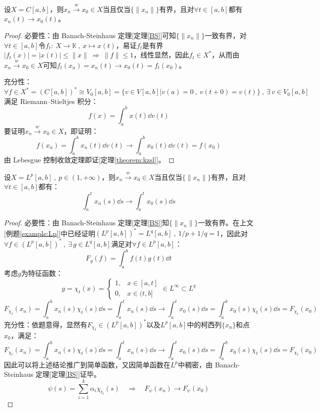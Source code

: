 \begin{theorem}
设$X=C[a,b]$，则$x_n \xrightarrow{w} x_0 \in X$当且仅当$\{\|x_n\|\}$有界，且对$\forall t \in [a,b]$都有$x_n(t) \to x_0(t)$。
\end{theorem}
\begin{proof}
必要性：由 Banach-Steinhaus 定理[定理\ref{BS}]可知$\{\|x_n\|\}$一致有界，对$\forall t \in [a,b]$令$f_t: \ X \to \mathbb{K} \ , \ x \mapsto x(t)$，易证$f_t$是有界$|f_t(x)|=|x(t)|\leq\|x\| \ \Rightarrow \ \|f\| \leq 1$，线性显然，因此$f_t \in X^*$，从而由$x_n \xrightarrow{w} x_0 \in X$可知$f_t(x_n)=x_n(t) \to x_0(t)=f_t(x_0)$。

充分性：$\forall f \in X^*=(C[a,b])^*\cong V_0[a,b]=\{v \in V[a,b]|v(a)=0 \ , \ v(t+0)=v(t)\} \ , \ \exists \, v \in V_0[a,b]$满足 Riemann–Stieltjes 积分：
\[f(x)=\int_a^bx(t)\dd{v(t)}\]
要证明$x_n \xrightarrow{w} x_0 \in X$，即证明：
\[f(x_n)=\int_a^bx_n(t)\dd{v(t)} \to \int_a^bx_0(t)\dd{v(t)}=f(x_0)\]
由 Lebesgue 控制收敛定理即证[定理\ref{theorem:kzsl}]。
\end{proof}

\begin{theorem}
设$X=L^p[a,b] \ , \ p\in(1,+\infty)$，则$x_n \xrightarrow{w} x_0 \in X$当且仅当$\{\|x_n\|\}$有界，且对$\forall t \in [a,b]$都有：
\[\int_a^tx_n(s)\dd{s} \to \int_a^tx_0(s)\dd{s}\]
\end{theorem}
\begin{proof}
必要性：由 Banach-Steinhaus 定理[定理\ref{BS}]知$\{\|x_n\|\}$一致有界。在上文[例题\ref{example:Lp}]中已经证明$(L^p[a,b])^*=L^q[a,b] \ , \ 1/p+1/q=1$，因此对$\forall f \in (L^p[a,b])^* \ , \ \exists \, g \in L^q[a,b]$满足对$\forall f \in L^p[a,b]$：
\[F_g(f)=\int_a^bf(t)g(t)\dd{t}\]
考虑$g$为特征函数：
\[g=\chi_t(x)=\left\{\begin{array}{rl}
1, & x \in [a,t] \\ 0, & x \in (t,b]
\end{array}\right. 
\in L^{\infty} \subset L^q\]
\[F_{\chi_t}(x_n)=\int_a^bx_n(s)\chi_t(s)\dd{s}=\int_a^tx_n(s)\dd{s} \to \int_a^tx_0(s)\dd{s}=\int_a^bx_0(s)\chi_t(s)\dd{s}=F_{\chi_t}(x_0)\]
充分性：依题意得，显然有$F_{\chi_t} \in (L^p[a,b])^*$以及$L^p[a,b]$中的柯西列$\{x_n\}$和点$x_0$，满足：
\[F_{\chi_t}(x_n)=\int_a^bx_n(s)\chi_t(s)\dd{s}=\int_a^tx_n(s)\dd{s} \to \int_a^tx_0(s)\dd{s}=\int_a^bx_0(s)\chi_t(s)\dd{s}=F_{\chi_t}(x_0)\]
因此可以将上述结论推广到简单函数，又因简单函数在$L^p$中稠密，由 Banach-Steinhaus 定理[定理\ref{BS}]证毕。
\[\psi(s)=\sum_{i=1}^k\alpha_i\chi_{t_i}(s) \quad \Rightarrow \quad F_{\psi}(x_n) \to F_{\psi}(x_0)\]
\end{proof}

